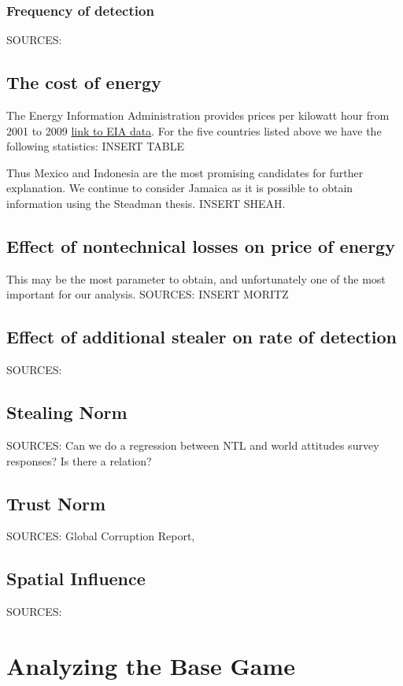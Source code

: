 \documentclass{article}
\begin{document}
\subsubsection{Frequency of detection}
SOURCES: 
\subsection{The cost of energy}
The Energy Information Administration provides prices per kilowatt hour from 2001 to 2009 \href{http://www.eia.gov/countries/prices/electricity_households.cfm}{ link to EIA data}. For the five countries listed above we have the following statistics: 
INSERT TABLE 

Thus Mexico and Indonesia are the most promising candidates for further explanation. We continue to consider Jamaica as it is possible to obtain information using the Steadman thesis. INSERT SHEAH. 
 
\subsection{Effect of nontechnical losses on price of energy}
This may be the most parameter to obtain, and unfortunately one of the most important for our analysis. 
SOURCES: INSERT MORITZ
\subsection{Effect of additional stealer on rate of detection}
SOURCES: 
\subsection{Stealing Norm}
SOURCES: Can we do a regression between NTL and world attitudes survey responses? Is there a relation? 
\subsection{Trust Norm}
SOURCES:  Global Corruption Report, 
\subsection{Spatial Influence}  
SOURCES:
\section{Analyzing the Base Game}                                                                                                  \\
\end{document}
